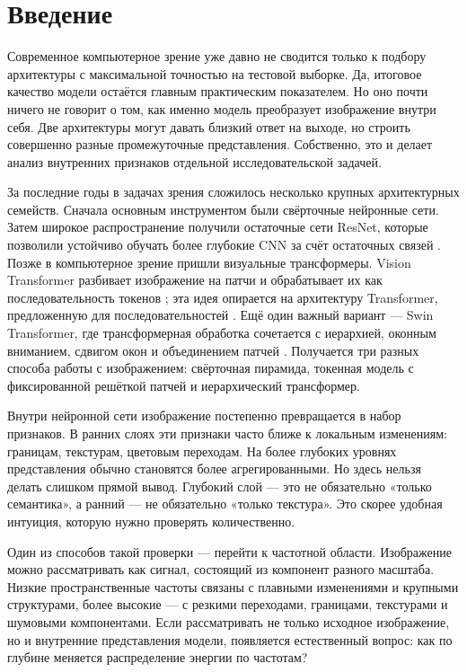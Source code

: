 \chapter{Введение}

Современное компьютерное зрение уже давно не сводится только к подбору архитектуры с максимальной точностью на тестовой выборке. Да, итоговое качество модели остаётся главным практическим показателем. Но оно почти ничего не говорит о том, как именно модель преобразует изображение внутри себя. Две архитектуры могут давать близкий ответ на выходе, но строить совершенно разные промежуточные представления. Собственно, это и делает анализ внутренних признаков отдельной исследовательской задачей.

За последние годы в задачах зрения сложилось несколько крупных архитектурных семейств. Сначала основным инструментом были свёрточные нейронные сети. Затем широкое распространение получили остаточные сети ResNet, которые позволили устойчиво обучать более глубокие CNN за счёт остаточных связей \cite{he2016deep}. Позже в компьютерное зрение пришли визуальные трансформеры. Vision Transformer разбивает изображение на патчи и обрабатывает их как последовательность токенов \cite{dosovitskiy2021image}; эта идея опирается на архитектуру Transformer, предложенную для последовательностей \cite{vaswani2017attention}. Ещё один важный вариант — Swin Transformer, где трансформерная обработка сочетается с иерархией, оконным вниманием, сдвигом окон и объединением патчей \cite{liu2021swin}. Получается три разных способа работы с изображением: свёрточная пирамида, токенная модель с фиксированной решёткой патчей и иерархический трансформер.

Внутри нейронной сети изображение постепенно превращается в набор признаков. В ранних слоях эти признаки часто ближе к локальным изменениям: границам, текстурам, цветовым переходам. На более глубоких уровнях представления обычно становятся более агрегированными. Но здесь нельзя делать слишком прямой вывод. Глубокий слой — это не обязательно «только семантика», а ранний — не обязательно «только текстура». Это скорее удобная интуиция, которую нужно проверять количественно.

Один из способов такой проверки — перейти к частотной области. Изображение можно рассматривать как сигнал, состоящий из компонент разного масштаба. Низкие пространственные частоты связаны с плавными изменениями и крупными структурами, более высокие — с резкими переходами, границами, текстурами и шумовыми компонентами. Если рассматривать не только исходное изображение, но и внутренние представления модели, появляется естественный вопрос: как по глубине меняется распределение энергии по частотам?

